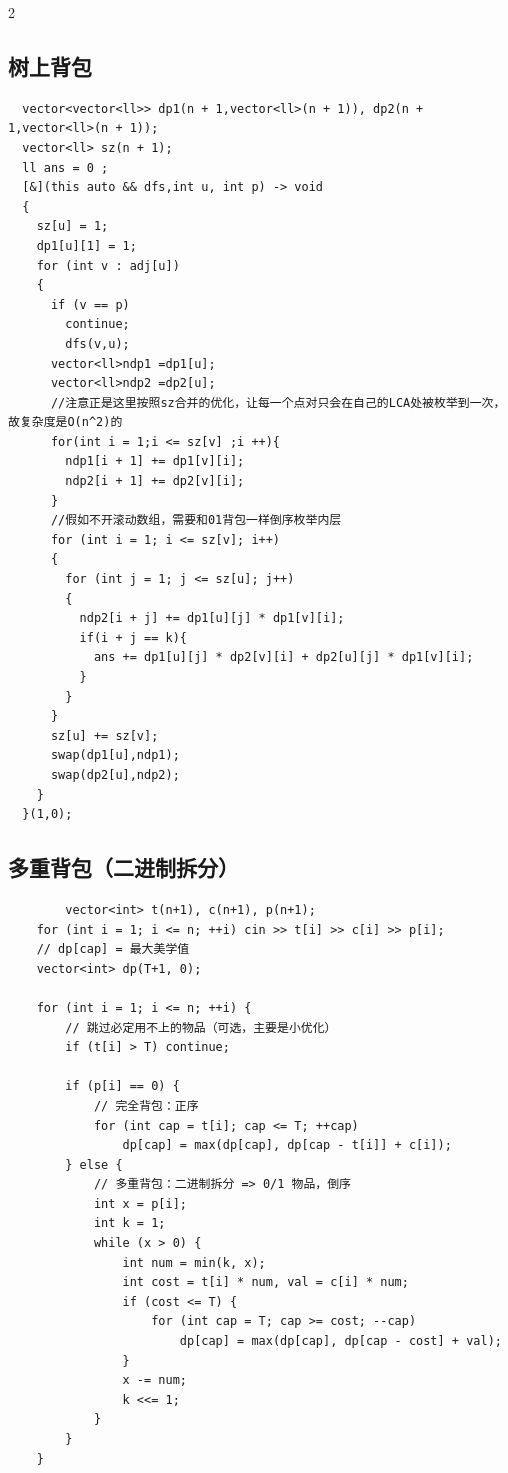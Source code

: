 \documentclass[10pt]{article}
\begin{document}
\begin{multicols*}{2}
\subsection{树上背包}


\begin{verbatim}
  vector<vector<ll>> dp1(n + 1,vector<ll>(n + 1)), dp2(n + 1,vector<ll>(n + 1));
  vector<ll> sz(n + 1);
  ll ans = 0 ;
  [&](this auto && dfs,int u, int p) -> void
  {
    sz[u] = 1;
    dp1[u][1] = 1;
    for (int v : adj[u])
    {
      if (v == p)
        continue;
        dfs(v,u);
      vector<ll>ndp1 =dp1[u];
      vector<ll>ndp2 =dp2[u];
      //注意正是这里按照sz合并的优化，让每一个点对只会在自己的LCA处被枚举到一次，故复杂度是O(n^2)的
      for(int i = 1;i <= sz[v] ;i ++){
        ndp1[i + 1] += dp1[v][i];
        ndp2[i + 1] += dp2[v][i];
      }
      //假如不开滚动数组，需要和01背包一样倒序枚举内层
      for (int i = 1; i <= sz[v]; i++)
      {
        for (int j = 1; j <= sz[u]; j++)
        {
          ndp2[i + j] += dp1[u][j] * dp1[v][i];
          if(i + j == k){
            ans += dp1[u][j] * dp2[v][i] + dp2[u][j] * dp1[v][i];
          }
        }
      }
      sz[u] += sz[v];
      swap(dp1[u],ndp1);
      swap(dp2[u],ndp2);
    }
  }(1,0);
\end{verbatim}


\subsection{多重背包（二进制拆分）}


\begin{verbatim}
 		vector<int> t(n+1), c(n+1), p(n+1);
    for (int i = 1; i <= n; ++i) cin >> t[i] >> c[i] >> p[i];
    // dp[cap] = 最大美学值
    vector<int> dp(T+1, 0);

    for (int i = 1; i <= n; ++i) {
        // 跳过必定用不上的物品（可选，主要是小优化）
        if (t[i] > T) continue;

        if (p[i] == 0) {
            // 完全背包：正序
            for (int cap = t[i]; cap <= T; ++cap)
                dp[cap] = max(dp[cap], dp[cap - t[i]] + c[i]);
        } else {
            // 多重背包：二进制拆分 => 0/1 物品，倒序
            int x = p[i];
            int k = 1;
            while (x > 0) {
                int num = min(k, x);
                int cost = t[i] * num, val = c[i] * num;
                if (cost <= T) {
                    for (int cap = T; cap >= cost; --cap)
                        dp[cap] = max(dp[cap], dp[cap - cost] + val);
                }
                x -= num;
                k <<= 1;
            }
        }
    }
\end{verbatim}





\end{multicols*}
\end{document}
